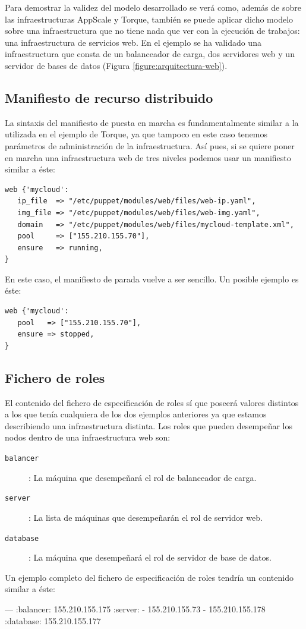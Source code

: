 Para demostrar la validez del modelo desarrollado se verá como, además de sobre las infraestructuras AppScale y Torque, también se puede aplicar dicho modelo sobre una infraestructura que no tiene nada que ver con la ejecución de trabajos: una infraestructura de servicios web. En el ejemplo se ha validado una infraestructura que consta de un balanceador de carga, dos servidores web y un servidor de bases de datos (Figura \ref{figure:arquitectura-web}).


\subsection{Manifiesto de recurso distribuido}

La sintaxis del manifiesto de puesta en marcha es fundamentalmente similar a la utilizada en el ejemplo de Torque, ya que tampoco en este caso tenemos parámetros de administración de la infraestructura. Así pues, si se quiere poner en marcha una infraestructura web de tres niveles podemos usar un manifiesto similar a éste:

\begin{lstlisting}
web {'mycloud':
   ip_file  => "/etc/puppet/modules/web/files/web-ip.yaml",
   img_file => "/etc/puppet/modules/web/files/web-img.yaml",
   domain   => "/etc/puppet/modules/web/files/mycloud-template.xml",
   pool     => ["155.210.155.70"],
   ensure   => running,
}
\end{lstlisting}

En este caso, el manifiesto de parada vuelve a ser sencillo. Un posible ejemplo es éste:

\begin{lstlisting}
web {'mycloud':
   pool   => ["155.210.155.70"],
   ensure => stopped,
}
\end{lstlisting}

\subsection{Fichero de roles}

El contenido del fichero de especificación de roles sí que poseerá valores distintos a los que tenía cualquiera de los dos ejemplos anteriores ya que estamos describiendo una infraestructura distinta. Los roles que pueden desempeñar los nodos dentro de una infraestructura web son:
\begin{description}
\item[\texttt{balancer}]: La máquina que desempeñará el rol de balanceador de carga.
\item[\texttt{server}]: La lista de máquinas que desempeñarán el rol de servidor web.
\item[\texttt{database}]: La máquina que desempeñará el rol de servidor de base de datos.
\end{description}

Un ejemplo completo del fichero de especificación de roles tendría un contenido similar a éste:
\begin{yamlcode}
--- 
:balancer: 155.210.155.175
:server:
- 155.210.155.73
- 155.210.155.178
:database: 155.210.155.177
\end{yamlcode}
